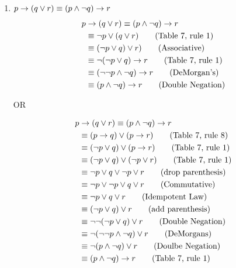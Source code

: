 \begin{questions}
\begin{solution}
\begin{enumerate}[label=(\alph*),itemsep=0pt,parsep=0pt,
topsep=0pt,partopsep=0pt]
    \vspace{-25pt}
    \begin{center}
    OR
    \end{center}

    \vspace{-25pt}
    \begin{align*}
      p & \rightarrow (\neg q \rightarrow r) \\
       & \equiv p \ra (q \vee r) \tag{Table 7, rule 3} \\
       & \equiv \neg (q \vee r) \ra \neg p  \tag{Table 7, rule 2}
    \end{align*}

    \item $p \rightarrow (q \vee r) \equiv (p \wedge \neg q) \rightarrow r$
    \begin{align*}
        p &\rightarrow (q \vee r) \equiv (p \wedge \neg q) \rightarrow r \\
            & \equiv \neg p \vee (q \vee r) \tag{Table 7, rule 1} \\
            & \equiv (\neg p \vee q) \vee r) \tag{Associative} \\
            & \equiv \neg (\neg p \vee q) \rightarrow r \tag{Table 7, rule 1} \\
            & \equiv (\neg \neg p \wedge \neg q) \rightarrow r \tag{DeMorgan's} \\
            & \equiv (p \wedge \neg q) \rightarrow r \tag{Double Negation} 
    \end{align*}
    
    \begin{center}
    OR
    \end{center}

    \begin{align*}
        p &\rightarrow (q \vee r) \equiv (p \wedge \neg q) \rightarrow r \\
        & \equiv (p \rightarrow q) \vee (p \rightarrow r) \tag{Table 7, rule 8} \\
        & \equiv (\neg p \vee q) \vee (p \rightarrow r) \tag{Table 7, rule 1} \\
        & \equiv (\neg p \vee q) \vee (\neg p \vee r) \tag{Table 7, rule 1} \\
        & \equiv \neg p \vee q \vee \neg p \vee r \tag{drop parenthesis} \\
        & \equiv \neg p \vee \neg p \vee q \vee r \tag{Commutative} \\
        & \equiv \neg p \vee q \vee r \tag{Idempotent Law} \\
        & \equiv (\neg p \vee q) \vee r \tag{add parenthesis} \\
        & \equiv \neg \neg (\neg p \vee q) \vee r \tag{Double Negation} \\
        & \equiv \neg (\neg \neg p \wedge \neg q) \vee r \tag{DeMorgans} \\
        & \equiv \neg (p \wedge \neg q) \vee r \tag{Doulbe Negation} \\
        & \equiv (p \wedge \neg q) \rightarrow r \tag{Table 7, rule 1}
    \end{align*}


\end{enumerate}
\end{solution}
\end{questions}
